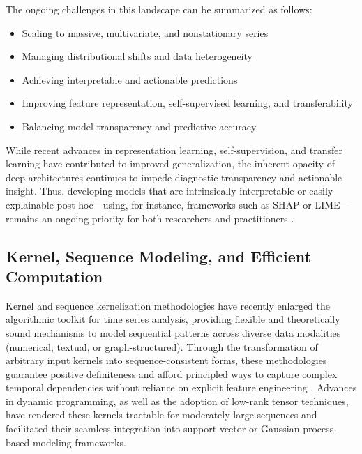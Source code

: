 The ongoing challenges in this landscape can be summarized as follows:

\begin{itemize}
    \item Scaling to massive, multivariate, and nonstationary series
    \item Managing distributional shifts and data heterogeneity
    \item Achieving interpretable and actionable predictions
    \item Improving feature representation, self-supervised learning, and transferability
    \item Balancing model transparency and predictive accuracy
\end{itemize}

While recent advances in representation learning, self-supervision, and transfer learning have contributed to improved generalization, the inherent opacity of deep architectures continues to impede diagnostic transparency and actionable insight. Thus, developing models that are intrinsically interpretable or easily explainable post hoc—using, for instance, frameworks such as SHAP or LIME—remains an ongoing priority for both researchers and practitioners \cite{ref82}.

\subsection{Kernel, Sequence Modeling, and Efficient Computation}

Kernel and sequence kernelization methodologies have recently enlarged the algorithmic toolkit for time series analysis, providing flexible and theoretically sound mechanisms to model sequential patterns across diverse data modalities (numerical, textual, or graph-structured). Through the transformation of arbitrary input kernels into sequence-consistent forms, these methodologies guarantee positive definiteness and afford principled ways to capture complex temporal dependencies without reliance on explicit feature engineering \cite{ref80}. Advances in dynamic programming, as well as the adoption of low-rank tensor techniques, have rendered these kernels tractable for moderately large sequences and facilitated their seamless integration into support vector or Gaussian process-based modeling frameworks.

